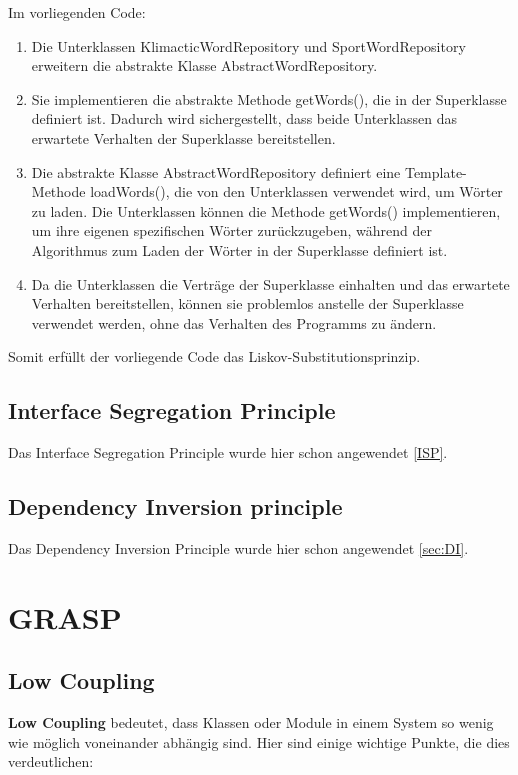 Im vorliegenden Code:
\begin{enumerate}
    \item Die Unterklassen KlimacticWordRepository und SportWordRepository erweitern die abstrakte Klasse AbstractWordRepository.
    \item Sie implementieren die abstrakte Methode getWords(), die in der Superklasse definiert ist. Dadurch wird sichergestellt, dass beide Unterklassen das erwartete Verhalten der Superklasse bereitstellen.
    \item Die abstrakte Klasse AbstractWordRepository definiert eine Template-Methode loadWords(), die von den Unterklassen verwendet wird, um Wörter zu laden. Die Unterklassen können die Methode getWords() implementieren, um ihre eigenen spezifischen Wörter zurückzugeben, während der Algorithmus zum Laden der Wörter in der Superklasse definiert ist.
    \item Da die Unterklassen die Verträge der Superklasse einhalten und das erwartete Verhalten bereitstellen, können sie problemlos anstelle der Superklasse verwendet werden, ohne das Verhalten des Programms zu ändern.
\end{enumerate}
    
Somit erfüllt der vorliegende Code das Liskov-Substitutionsprinzip.
\subsection*{Interface Segregation Principle}
Das Interface Segregation Principle wurde hier schon angewendet \ref{ISP}.

\subsection*{Dependency Inversion principle}
Das Dependency Inversion Principle wurde hier schon angewendet \ref{sec:DI}.


\section{GRASP}

\subsection{Low Coupling}
\textbf{Low Coupling} bedeutet, dass Klassen oder Module in einem System so wenig wie möglich voneinander abhängig sind. Hier sind einige wichtige Punkte, die dies verdeutlichen:

